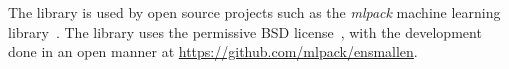 \documentclass[twoside,11pt]{article}
\begin{document}


The library is used by open source projects such as
the {\it mlpack} machine learning library~\citep{mlpack2018}.
The library uses the permissive BSD license~\citep{Laurent_2008},
with the development done in an open manner at \mbox{\url{https://github.com/mlpack/ensmallen}}.




\end{document}

